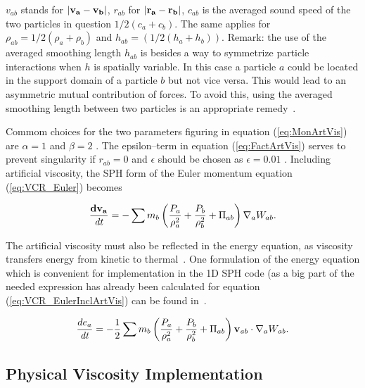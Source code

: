 \documentclass{report}
\begin{document}
$v_{ab}$ stands for $|{\bf v_a}-{\bf v_b}|$, $r_{ab}$ for $|{\bf r_a}-{\bf r_b}|$, $c_{ab}$ is the
averaged sound speed of the two particles in question $1/2(c_a+c_b)$. The same
applies for $\rho_{ab}=1/2(\rho_a+\rho_b)$ and $h_{ab}=(1/2(h_a+h_b))$. 
Remark: the use of
the averaged smoothing length $h_{ab}$ is besides a way to symmetrize particle
interactions when $h$ is spatially variable. In this case a particle $a$ could be
located in the support domain of a particle $b$ but not vice versa. This would
lead to an asymmetric mutual contribution of forces. To avoid this, using the
averaged smoothing length between two particles is an appropriate remedy~\cite{Liu2003}.

Commom choices for the two parameters figuring in equation (\ref{eq:MonArtVis}) are $\alpha=1$ and $\beta=2$ \cite{Monaghan1992}. The epsilon--term in equation (\ref{eq:FactArtVis}) serves to prevent singularity if $r_{ab}=0$ and $\epsilon$ should be chosen as $\epsilon=0.01$ \cite{Monaghan1992}.
Including artificial viscosity, the SPH form of the Euler momentum equation (\ref{eq:VCR_Euler}) becomes~\cite{Monaghan2005}

\begin{equation}
\label{eq:VCR_EulerInclArtVis}
\frac{{\bf dv_{a}}}{\mathit{dt}}=-\sum {m_{b}\left(\frac{P_{a}}{\rho_{a}^{2}}+\frac{P_{b}}{\rho _{b}^{2}}+\Pi _{ab}\right)\nabla_{a}W_{ab}}.
\end{equation}

The artificial viscosity must also be reflected in the energy equation, as viscosity 
transfers energy from kinetic to thermal~\cite{Monaghan2005}. One formulation of the 
energy equation which is convenient for implementation in the 1D SPH code (as a big 
part of the needed expression has already been calculated for equation
(\ref{eq:VCR_EulerInclArtVis}) can be found in~\cite{Liu2003}.

\begin{equation}
\label{eq:ECR_EulerInclArtVis}
\frac{de_{a}}{\mathit{dt}}=-\mathit{}\frac{1}{2}\sum{m_{b}\left(\frac{P_{a}}{\rho _{a}^{2}}+\frac{P_{b}}{\rho _{b}^{2}}+\Pi _{ab}\right){\bf v_{\mathit{ab}}}\cdot\nabla _{a}W_{\mathit{ab}}}.
\end{equation}

\subsection{Physical Viscosity Implementation}
\label{sec:PhysViscDescr}
\end{document}
